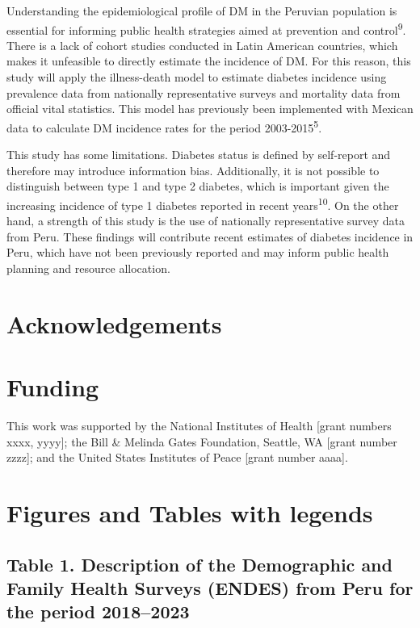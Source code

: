 \documentclass[
  letterpaper,
  DIV=11,
  numbers=noendperiod]{scrartcl}
\begin{document}
Understanding the epidemiological profile of DM in the Peruvian
population is essential for informing public health strategies aimed at
prevention and control\textsuperscript{9}. There is a lack of cohort
studies conducted in Latin American countries, which makes it unfeasible
to directly estimate the incidence of DM. For this reason, this study
will apply the illness-death model to estimate diabetes incidence using
prevalence data from nationally representative surveys and mortality
data from official vital statistics. This model has previously been
implemented with Mexican data to calculate DM incidence rates for the
period 2003-2015\textsuperscript{5}.

This study has some limitations. Diabetes status is defined by
self-report and therefore may introduce information bias. Additionally,
it is not possible to distinguish between type 1 and type 2 diabetes,
which is important given the increasing incidence of type 1 diabetes
reported in recent years\textsuperscript{10}. On the other hand, a
strength of this study is the use of nationally representative survey
data from Peru. These findings will contribute recent estimates of
diabetes incidence in Peru, which have not been previously reported and
may inform public health planning and resource allocation.

\section{Acknowledgements}\label{acknowledgements}

\section{Funding}\label{funding}

This work was supported by the National Institutes of Health {[}grant
numbers xxxx, yyyy{]}; the Bill \& Melinda Gates Foundation, Seattle, WA
{[}grant number zzzz{]}; and the United States Institutes of Peace
{[}grant number aaaa{]}.

\newpage{}

\section{Figures and Tables with
legends}\label{figures-and-tables-with-legends}

\subsection{Table 1. Description of the Demographic and Family Health
Surveys (ENDES) from Peru for the period
2018--2023}\label{table-1.-description-of-the-demographic-and-family-health-surveys-endes-from-peru-for-the-period-20182023}
\end{document}
